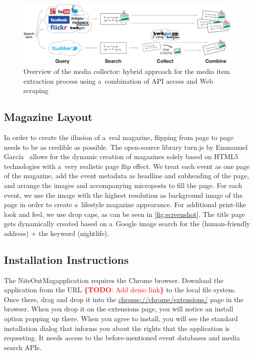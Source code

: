 \documentclass{acm_proc_article-sp}
\newcommand{\todo}[1]{\noindent\textcolor{red}{{\bf \{TODO}: #1{\bf \}}}}
\begin{document}
\begin{figure}[htb!]
\centering
\includegraphics[width=0.8\linewidth]{./architecture.pdf}
\caption{Overview of the media collector: hybrid approach for the media item extraction process using a~combination of API access and Web scraping}
\label{fig:architecture}
\end{figure}

\subsection{Magazine Layout}
In order to create the illusion of a~real magazine,
flipping from page to page needs to be as credible as possible.
The open-source library turn.js by Emmanuel García~\cite{TurnJs2012}
allows for the dynamic creation of magazines solely based on HTML5 technologies
with a~very realistic page flip effect.
We treat each event as one page of the magazine,
add the event metadata as headline and subheading of the page,
and arrange the images and accompanying microposts to fill the page.
For each event, we use the image with the highest resolution
as background image of the page in order to create a~lifestyle magazine appearance.
For additional print-like look and feel, we use drop caps,
as can be seen in \autoref{fig:screenshot}.
The title page gets dynamically created based on a~Google image search
for the (human-friendly address) $+$ the keyword (nightlife).

\subsection{Installation Instructions}
The NiteOutMag\texttrademark application requires the Chrome browser.
Download the application from the URL \todo{Add demo link} to the local file system.
Once there, drag and drop it into the \url{chrome://chrome/extensions/} page in the browser.
When you drop it on the extensions page, you will notice an install option popping up there.
When you agree to install, you will see the standard installation dialog
that informs you about the rights that the application is requesting.
It needs access to the before-mentioned event databases and media search APIs.
\end{document}

